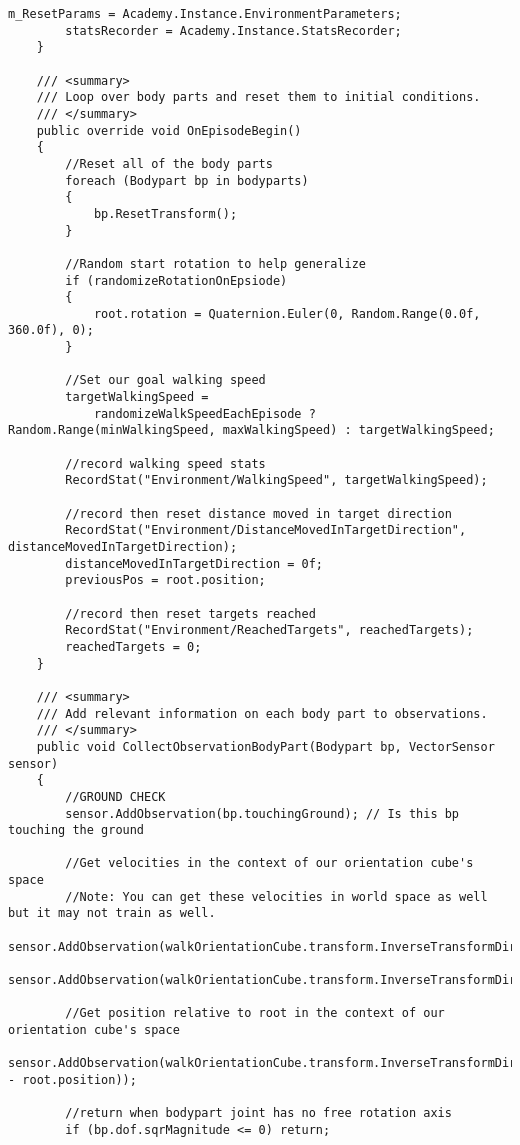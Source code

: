 \begin{lstlisting}[caption={Agenten Skript},captionpos=b,label={lst:skript_agent1}]
        m_ResetParams = Academy.Instance.EnvironmentParameters;
        statsRecorder = Academy.Instance.StatsRecorder;
    }

    /// <summary>
    /// Loop over body parts and reset them to initial conditions.
    /// </summary>
    public override void OnEpisodeBegin()
    {
        //Reset all of the body parts
        foreach (Bodypart bp in bodyparts)
        {
            bp.ResetTransform();
        }

        //Random start rotation to help generalize
        if (randomizeRotationOnEpsiode)
        {
            root.rotation = Quaternion.Euler(0, Random.Range(0.0f, 360.0f), 0);
        }

        //Set our goal walking speed
        targetWalkingSpeed =
            randomizeWalkSpeedEachEpisode ? Random.Range(minWalkingSpeed, maxWalkingSpeed) : targetWalkingSpeed;

        //record walking speed stats
        RecordStat("Environment/WalkingSpeed", targetWalkingSpeed);

        //record then reset distance moved in target direction
        RecordStat("Environment/DistanceMovedInTargetDirection", distanceMovedInTargetDirection);
        distanceMovedInTargetDirection = 0f;
        previousPos = root.position;

        //record then reset targets reached
        RecordStat("Environment/ReachedTargets", reachedTargets);
        reachedTargets = 0;
    }

    /// <summary>
    /// Add relevant information on each body part to observations.
    /// </summary>
    public void CollectObservationBodyPart(Bodypart bp, VectorSensor sensor)
    {
        //GROUND CHECK
        sensor.AddObservation(bp.touchingGround); // Is this bp touching the ground

        //Get velocities in the context of our orientation cube's space
        //Note: You can get these velocities in world space as well but it may not train as well.
        sensor.AddObservation(walkOrientationCube.transform.InverseTransformDirection(bp.rb.velocity));
        sensor.AddObservation(walkOrientationCube.transform.InverseTransformDirection(bp.rb.angularVelocity));

        //Get position relative to root in the context of our orientation cube's space
        sensor.AddObservation(walkOrientationCube.transform.InverseTransformDirection(bp.rb.position - root.position));

        //return when bodypart joint has no free rotation axis
        if (bp.dof.sqrMagnitude <= 0) return;


\end{lstlisting}

